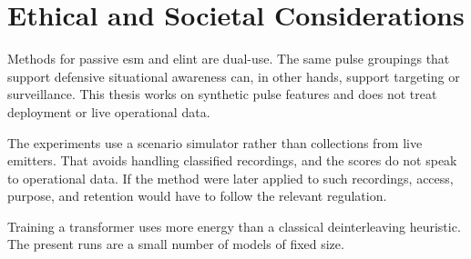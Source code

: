\section{Ethical and Societal Considerations}\label{sec:intro:ethics}

Methods for passive \gls{esm} and \gls{elint} are dual-use.
The same pulse groupings that support defensive situational awareness can, in other hands, support targeting or surveillance.
This thesis works on synthetic pulse features and does not treat deployment or live operational data.

The experiments use a scenario simulator rather than collections from live emitters.
That avoids handling classified recordings, and the scores do not speak to operational data.
If the method were later applied to such recordings, access, purpose, and retention would have to follow the relevant regulation.

Training a transformer uses more energy than a classical deinterleaving heuristic.
The present runs are a small number of models of fixed size.
